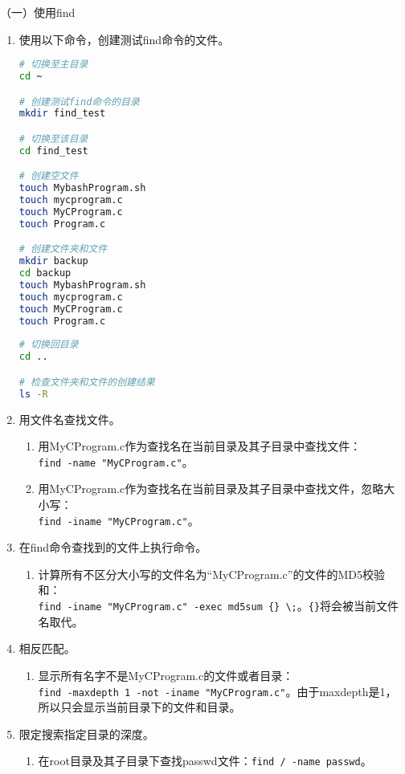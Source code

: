 \vspace{0.1in}
（一）使用find
\begin{enumerate}
  \item 使用以下命令，创建测试find命令的文件。
\begin{lstlisting}[language=bash]
# 切换至主目录
cd ~

# 创建测试find命令的目录
mkdir find_test

# 切换至该目录
cd find_test

# 创建空文件
touch MybashProgram.sh
touch mycprogram.c
touch MyCProgram.c
touch Program.c

# 创建文件夹和文件 
mkdir backup
cd backup
touch MybashProgram.sh
touch mycprogram.c
touch MyCProgram.c
touch Program.c
 
# 切换回目录
cd ..

# 检查文件夹和文件的创建结果
ls -R
\end{lstlisting}
  \item 用文件名查找文件。
    \begin{enumerate}
      \item 用MyCProgram.c作为查找名在当前目录及其子目录中查找文件：\\ \verb|find -name "MyCProgram.c"|。
      \item 用MyCProgram.c作为查找名在当前目录及其子目录中查找文件，忽略大小写：\\ \verb|find -iname "MyCProgram.c"|。
    \end{enumerate}
  \item 在find命令查找到的文件上执行命令。
    \begin{enumerate}
      \item 计算所有不区分大小写的文件名为“MyCProgram.c”的文件的MD5校验和：\\ \verb|find -iname "MyCProgram.c" -exec md5sum {} \;|。\verb|{}|将会被当前文件名取代。
    \end{enumerate}
  \item 相反匹配。
    \begin{enumerate}
      \item 显示所有名字不是MyCProgram.c的文件或者目录：\\ \verb|find -maxdepth 1 -not -iname "MyCProgram.c"|。由于maxdepth是1，所以只会显示当前目录下的文件和目录。
    \end{enumerate}
  \item 限定搜索指定目录的深度。
    \begin{enumerate}
      \item 在root目录及其子目录下查找passwd文件：\verb|find / -name passwd|。

\end{enumerate}
\end{enumerate}
